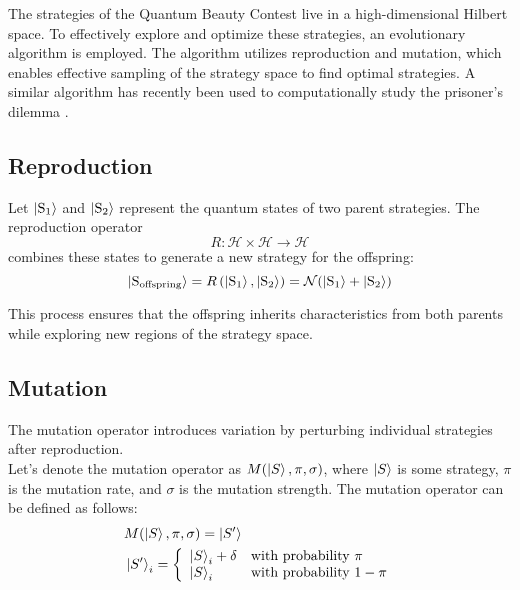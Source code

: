 The strategies of the Quantum Beauty Contest live in a high-dimensional Hilbert space. To effectively explore and optimize these strategies, an evolutionary algorithm is employed. The algorithm utilizes reproduction and mutation, which enables effective sampling of the strategy space to find optimal strategies. A similar algorithm has recently been used to computationally study the prisoner's dilemma \citep{vie2021evolutionary}.\\

\subsection{Reproduction}

Let $\ket{{\text{S}_1}}$ and $\ket{{\text{S}_2}}$ represent the quantum states of two parent strategies. The reproduction operator $$R: \mathcal{H} \times \mathcal{H} \rightarrow \mathcal{H}$$ combines these states to generate a new strategy for the offspring:
\begin{equation}
\ket{\text{S}_{\text{offspring}}} = {R}\left(\ket{\text{S}_1}, \ket{{\text{S}_2}}\right) = \mathcal{N}(\ket{\text{S}_1} + \ket{{\text{S}_2}})
\end{equation}

This process ensures that the offspring inherits characteristics from both parents while exploring new regions of the strategy space.\\

\subsection{Mutation}

The mutation operator introduces variation by perturbing individual strategies after reproduction.\\

Let's denote the mutation operator as $M(\ket{S}, \pi, \sigma)$, where $\ket{S}$ is some strategy, $\pi$ is the mutation rate, and $\sigma$ is the mutation strength. The mutation operator can be defined as follows:
\begin{align}
&M(\ket{S}, \pi, \sigma) = \ket{S'}\\
&\ket{S'}_i = \left\{
\begin{array}{ll}
\ket{S}_i + \delta & \text{with probability } \pi \\
\ket{S}_i & \text{with probability } 1 - \pi
\end{array}
\right.
\end{align}

